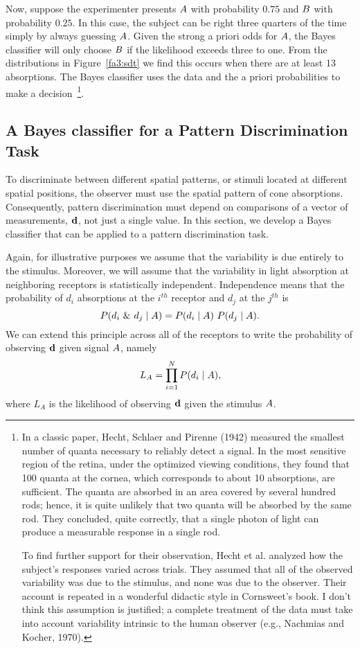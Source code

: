 Now, suppose the experimenter presents $\mbox{$A$}$ with probability
$0.75$ and $\mbox{$B$}$ with probability $0.25$.  In this case, the
subject can be right three quarters of the time simply by always
guessing $\mbox{$A$}$.  Given the strong a priori odds for $\mbox{$A$}$, the
Bayes classifier will only choose $\mbox{$B$}$ if the likelihood exceeds
three to one.  From the distributions in Figure~\ref{fa3:sdt} we find
this occurs when there are at least 13 absorptions.  The Bayes
classifier uses the data and the a priori probabilities to make a
decision~\footnote{ In a classic paper, Hecht, Schlaer and Pirenne
(1942) measured the smallest number of quanta necessary to reliably
detect a signal.  In the most sensitive region of the retina, under
the optimized viewing conditions, they found that 100 quanta at the
cornea, which corresponds to about 10 absorptions, are sufficient.
The quanta are absorbed in an area covered by several hundred rods;
hence, it is quite unlikely that two quanta will be absorbed by the
same rod.  They concluded, quite correctly, that a single photon of
light can produce a measurable response in a single rod.

To find further support for their observation, Hecht et al. analyzed
how the subject's responses varied across trials.  They assumed that
all of the observed variability was due to the stimulus, and none was
due to the observer.  Their account is repeated in a wonderful
didactic style in Cornsweet's book.  I don't think this assumption is
justified; a complete treatment of the data must take into account
variability intrinsic to the human observer (e.g., Nachmias and
Kocher, 1970). }.

\subsection*{A Bayes classifier for a Pattern Discrimination Task}
To discriminate between different spatial patterns, or stimuli located
at different spatial positions, the observer must use the spatial
pattern of cone absorptions.  Consequently, pattern discrimination
must depend on comparisons of a vector of measurements, $\mbox{${\bf d}$}$, not
just a single value.  In this section, we develop a
Bayes classifier that can be applied to a pattern discrimination task.

Again, for illustrative purposes we assume that the variability is due
entirely to the stimulus.  Moreover, we will assume that the
variability in light absorption at neighboring receptors is
statistically independent.  Independence means that the probability of
$d_i$ absorptions at the $i^{th}$ receptor and $d_j$ at the $j^{th}$
is
\[
P(d_i ~\&~ d_j \mid \mbox{$A$}) = P(d_i \mid A)~P(d_j \mid \mbox{$A$}) .
\]
We can extend this principle across all of the receptors to write the
probability of observing $\mbox{${\bf d}$}$ given signal $\mbox{$A$}$, namely
\[
L_A = \prod_{i=1}^{N} P(d_i \mid \mbox{$A$}) ,
\]
where $L_A$ is the likelihood of observing $\mbox{${\bf d}$}$ given the stimulus
$\mbox{$A$}$.

